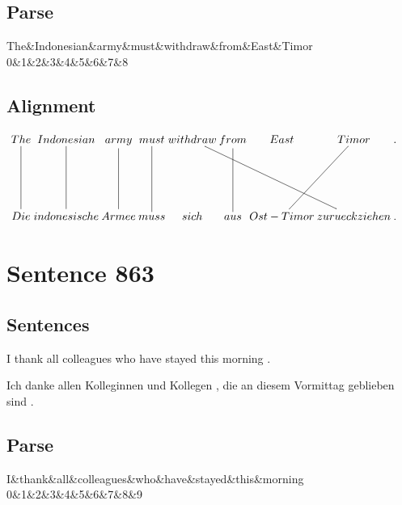 \documentclass{report}
\begin{document}
\subsection*{Parse}
\begin{dependency}[theme=simple]
\begin{deptext}[column sep=.5cm, row sep=.1ex]
The\&Indonesian\&army\&must\&withdraw\&from\&East\&Timor\\
0\&1\&2\&3\&4\&5\&6\&7\&8\\
\end{deptext}
\end{dependency}


\subsection*{Alignment}
\scriptsize{
$
\xymatrix@C-2.3pc{
The \ar @{-} [dd] & Indonesian \ar @{-} [dd] & army \ar @{-} [dd] & must \ar @{-} [dd] & withdraw \ar @{-} [ddrrr] & from \ar @{-} [dd] & East & Timor \ar @{-} [ddl] & .\\\\
Die & indonesische & Armee & muss & sich & aus & Ost-Timor & zurueckziehen & .
}$}
\newpage\section*{Sentence 863}

\subsection*{Sentences}
I thank all colleagues who have stayed this morning .

\noindent Ich danke allen Kolleginnen und Kollegen , die an diesem Vormittag geblieben sind .



\subsection*{Parse}
\begin{dependency}[theme=simple]
\begin{deptext}[column sep=.5cm, row sep=.1ex]
I\&thank\&all\&colleagues\&who\&have\&stayed\&this\&morning\\
0\&1\&2\&3\&4\&5\&6\&7\&8\&9\\
\end{deptext}
\end{dependency}
\end{document}
